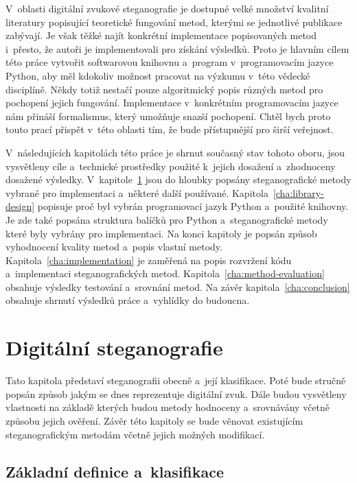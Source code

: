 V~oblasti digitální zvukové steganografie je dostupné velké množství kvalitní
literatury popisující teoretické fungování metod, kterými se jednotlivé
publikace zabývají. Je však těžké najít konkrétní implementace popisovaných
metod i~přesto, že autoři je implementovali pro získání výsledků. Proto je
hlavním cílem této práce vytvořit softwarovou knihovnu a~program
v~programovacím jazyce Python, aby měl kdokoliv možnost pracovat na výzkumu
v~této vědecké disciplíně. Někdy totiž nestačí pouze algoritmický popis různých
metod pro pochopení jejich fungování. Implementace v~konkrétním programovacím
jazyce nám přináší formalismus, který umožňuje snazší pochopení. Chtěl bych
proto touto prací přispět v~této oblasti tím, že bude přístupnější pro širší
veřejnost.

V~následujících kapitolách této práce je shrnut současný stav tohoto oboru,
jsou vysvětleny cíle a~technické prostředky použité k~jejich dosažení
a~zhodnoceny dosažené výsledky. V~kapitole~\ref{cha:digital-steganography} jsou
do hloubky popsány steganografické metody vybrané pro implementaci a~některé
další používané. Kapitola~\ref{cha:library-design} popisuje proč byl vybrán
programovací jazyk Python a~použité knihovny. Je zde také popsána struktura
balíčků pro Python a~steganografické metody které byly vybrány pro
implementaci. Na konci kapitoly je popsán způsob vyhodnocení kvality metod
a~popis vlastní metody. Kapitola~\ref{cha:implementation} je zaměřená na popis
rozvržení kódu a~implementaci steganografických metod.
Kapitola~\ref{cha:method-evaluation} obsahuje výsledky testování a~srovnání
metod. Na závěr kapitola~\ref{cha:conclusion} obsahuje shrnutí výsledků práce
a~vyhlídky do budoucna.


\chapter{Digitální steganografie}
\label{cha:digital-steganography}

Tato kapitola představí steganografii obecně a~její klasifikace. Poté bude
stručně popsán způsob jakým se dnes reprezentuje digitální zvuk. Dále budou
vysvětleny vlastnosti na základě kterých budou metody hodnoceny a~srovnávány
včetně způsobu jejich ověření. Závěr této kapitoly se bude věnovat existujícím
steganografickým metodám včetně jejich možných modifikací.

\section{Základní definice a~klasifikace}
\label{sec:definitions}

